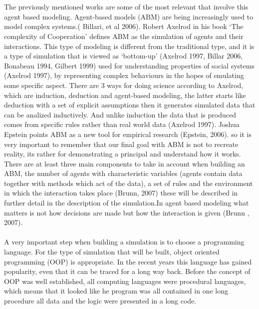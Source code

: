 \documentclass{article}
\begin{document}
\\\\The previously mentioned works are some of the most relevant that involve this agent based modeling. Agent-based models (ABM) are being increasingly used to model complex systems.( Billari, et al 2006). Robert Axelrod in his book ‘The complexity of Cooperation’ defines ABM as the simulation of agents and their interactions. This type of modeling is different from the traditional type, and it is a type of simulation that is viewed as ‘bottom-up’ (Axelrod 1997, Billar 2006, Bonabeau 1994, Gilbert 1999) used for understanding properties of social systems (Axelrod 1997), by representing complex behaviours in the hopes of emulating some specific aspect. There are 3 ways for doing science according to Axelrod, which are induction, deduction and agent-based modeling, the latter starts like deduction with a set of explicit assumptions then it generates simulated data that can be analized inductively. And unlike induction the data that is produced comes from specific rules rather than real world data (Axelrod 1997). Joshua Epstein points ABM as a new tool for empirical research (Epstein, 2006). so it is very important to remember that our final goal with ABM is not to recreate reality, its rather for demonstrating a principal and understand how it works.
There are at least three main components to take in account when building an ABM, the number of agents with characteristic variables (agents contain data together with methods which act of the data), a set of rules and the environment in which the interaction takes place (Brunn, 2007) these will be described in further detail in the description of the simulation.In agent based modeling what matters is not how decisions are made but how the interaction is given (Brunn , 2007).
\\\\A very important step when building a simulation is to choose a programming language. For the type of simulation that will be built, object oriented programming (OOP) is appropriate. In the recent years this language has gained popularity, even that it can be traced for a long way back. Before the concept of OOP was well established, all computing languages were procedural languages, which means that it looked like he program was all contained in one long procedure all data and the logic were presented in a long code.
\end{document}
